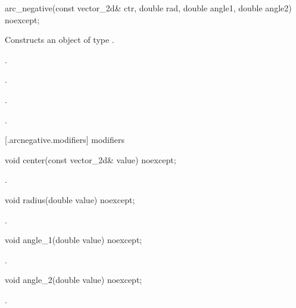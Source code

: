 \begin{itemdecl}
    arc_negative(const vector_2d& ctr, double rad, double angle1,
      double angle2) noexcept;
\end{itemdecl}
\begin{itemdescr}
	\pnum
	\effects
	Constructs an object of type .
	
	\pnum
	\postconditions
	.

	.

	.

	.

\end{itemdescr}

 [\iotwod.arcnegative.modifiers]{ modifiers}

\begin{itemdecl}
    void center(const vector_2d& value) noexcept;
\end{itemdecl}
\begin{itemdescr}
	\pnum
	\postconditions
	.
	
\end{itemdescr}

\begin{itemdecl}
    void radius(double value) noexcept;
\end{itemdecl}
\begin{itemdescr}
	\pnum
	\postconditions
	.
	
\end{itemdescr}

\begin{itemdecl}
    void angle_1(double value) noexcept;
\end{itemdecl}
\begin{itemdescr}
	\pnum
	\postconditions
	.
	
\end{itemdescr}

\begin{itemdecl}
    void angle_2(double value) noexcept;
\end{itemdecl}
\begin{itemdescr}
	\pnum
	\postconditions
	.
	
\end{itemdescr}

